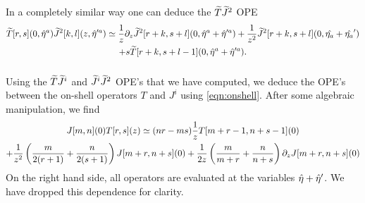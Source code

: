 \documentclass[../main.tex]{subfiles}
\begin{document}
In a completely similar way one can deduce the $\widetilde{T} \widetilde{J}^2$ OPE
\begin{multline}
\widetilde{T}[r,s](0,\Hat{\eta}^a) \widetilde{J}^2[k,l] (z,\Hat{\eta}'^a) \simeq \frac1z \partial_z \widetilde{J}^2[r+k,s+l](0,\Hat{\eta}^a + \Hat{\eta}'^a) + \frac{1}{z^2} \widetilde{J}^2[r+k,s+l](0,\Hat{\eta_a} + \Hat{\eta_a}')  \\ + s \widetilde{T}[r+k,s+l-1] (0,\Hat{\eta}^a + \Hat{\eta}'^a) .
\end{multline}

\subsubsection{}

Using the $\widetilde{T} \widetilde{J}^i$ and $\widetilde{J}^i \widetilde{J}^2$ OPE's that we have computed, we deduce the OPE's between the on-shell operators $T$ and $J^i$ using \eqref{eqn:onshell}.
After some algebraic manipulation, we find
\begin{multline}
J[m, n](0)T[r, s](z) \simeq (nr-ms) { 1\over z}T[m + r -1, n + s -1](0) \\ + {1 \over z^2}\left({m \over 2(r + 1)} + {n \over 2(s + 1)}\right)J[m + r, n + s](0)
+{1 \over 2 z}\left({m \over m + r} + {n \over n + s} \right)\partial_z J[m + r, n + s](0)
\end{multline}
On the right hand side, all operators are evaluated at the variables $\Hat{\eta} +\Hat{\eta}'$.  We have dropped this dependence for clarity.
\end{document}
